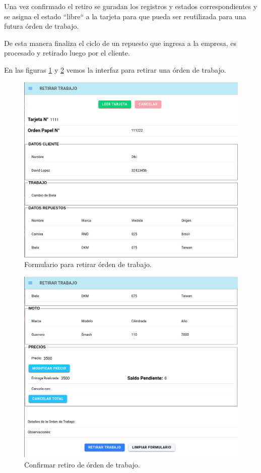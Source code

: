 Una vez confirmado el retiro se guradan los registros y estados correspondientes y se asigna el estado ``libre`` a la tarjeta para que pueda ser reutilizada para una futura órden de trabajo.

De esta manera finaliza el ciclo de un repuesto que ingresa a la empresa, es procesado y retirado luego por el cliente.

En las figuras \ref{fig:retirar1} y \ref{fig:retirar2} vemos la interfaz para retirar una órden de trabajo.

\begin{figure}[H]
	\centering
	\includegraphics[scale=.30]{./Figures/retirar-1.png}
	\caption{Formulario para retirar órden de trabajo.}
	\label{fig:retirar1}
\end{figure}

\begin{figure}[H]
	\centering
	\includegraphics[scale=.30]{./Figures/retirar-2.png}
	\caption{Confirmar retiro de órden de trabajo.}
	\label{fig:retirar2}
\end{figure}

